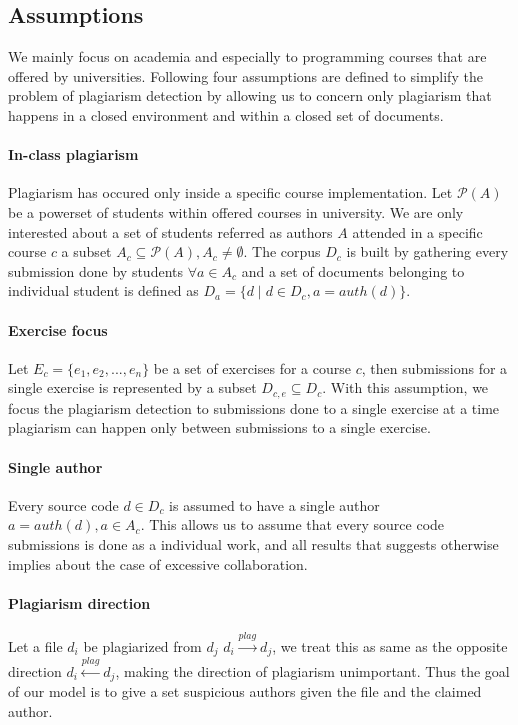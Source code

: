 \subsection{Assumptions}

We mainly focus on academia and especially to programming courses that are offered by 
universities. Following four assumptions are defined to simplify the problem of plagiarism
detection by allowing us to concern only plagiarism that happens in a closed environment and within a closed set of documents. 

\paragraph{In-class plagiarism} Plagiarism has occured only inside a 
specific course implementation. Let $\mathcal{P}(A)$ be a powerset of students within offered courses in university. We are only interested about a set of students referred as authors $A$ attended in a specific course $c$ \ie a subset $A_c \subseteq \mathcal{P}(A), A_c \neq \emptyset$. The corpus $D_c$ is built by gathering every submission done by students $\forall a \in A_c$ and a set of documents belonging to individual student is defined as $D_a = \{d \mid d \in D_c, a = auth(d)\}$. 


\paragraph{Exercise focus} 
Let $E_c = \{e_1, e_2, ..., e_n\}$ be a set of exercises for a course $c$, then submissions for a single exercise is represented by a subset $D_{c,e} \subseteq D_c$. With this assumption, we focus the plagiarism detection to submissions done to a single exercise at a time \ie plagiarism can happen only between submissions to a single exercise.

\paragraph{Single author} 
Every source code $d \in D_c$ is assumed to have a single author $a = auth(d), a \in A_c$. This allows us to assume that every source code submissions is done as a individual work, and all results that suggests otherwise implies about the case of excessive collaboration. 

\paragraph{Plagiarism direction} 
Let a file $d_i$ be plagiarized from $d_j$ \ie $d_i \xrightarrow{plag} d_j$, we treat this as same as the opposite direction $d_i \xleftarrow{plag} d_j$, making the direction of plagiarism unimportant. Thus the goal of our model is to give a set suspicious authors given the file and the claimed author.

